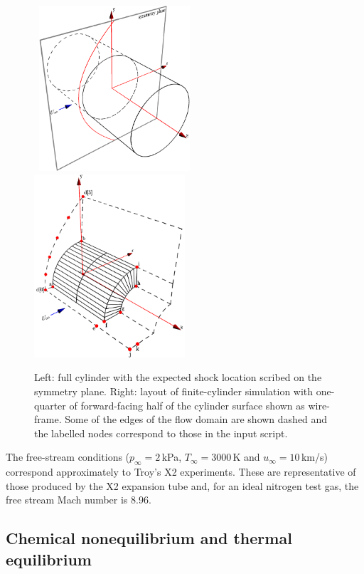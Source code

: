 \begin{figure}[htbp]
\hbox{
  \includegraphics[width=0.5\textwidth]{../3D/finite-cylinder/schematics/full-cyl-schematic.pdf}
  \includegraphics[width=0.5\textwidth]{../3D/finite-cylinder/schematics/cyl-schematic.pdf}
}
\caption{Left: full cylinder with the expected shock location scribed on the symmetry plane.
   Right: layout of finite-cylinder simulation with one-quarter of forward-facing half 
   of the cylinder surface shown as wire-frame.
   Some of the edges of the flow domain are shown dashed and
   the labelled nodes correspond to those in the input script.}
\label{finite-cyl-layout}
\end{figure}

\medskip 
The free-stream conditions ($p_{\infty} = 2$\,kPa, $T_{\infty} = 3000$\,K
and $u_{\infty} = 10$\,km/s) correspond approximately to Troy's X2 experiments.
These are representative of those produced by the X2 expansion tube and,
for an ideal nitrogen test gas, the free stream Mach number is 8.96.

\subsection{Chemical nonequilibrium and thermal equilibrium}

